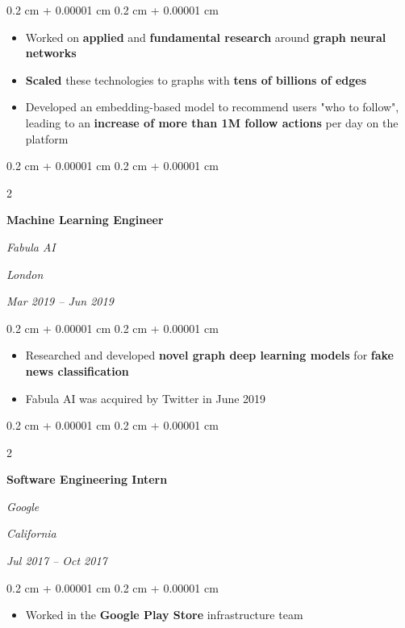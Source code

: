 \documentclass[10pt, letterpaper]{article}
\newenvironment{highlights}{
    \begin{itemize}[
        topsep=0.10 cm,
        parsep=0.10 cm,
        partopsep=0pt,
        itemsep=0pt,
        leftmargin=0.4 cm + 10pt
    ]
}{
    \end{itemize}
} %
\newenvironment{onecolentry}{
    \begin{adjustwidth}{
        0.2 cm + 0.00001 cm
    }{
        0.2 cm + 0.00001 cm
    }
}{
    \end{adjustwidth}
} %
\newenvironment{twocolentry}[2][]{
    \onecolentry
    \def\secondColumn{#2}
    \setcolumnwidth{\fill, 4.5 cm}
    \begin{paracol}{2}
}{
    \switchcolumn \raggedleft \secondColumn
    \end{paracol}
    \endonecolentry
} %
\begin{document}
    \vspace{0.10 cm}
    \begin{onecolentry}
        \begin{highlights}
            \item Worked on \textbf{applied} and \textbf{fundamental research} around \textbf{graph neural networks}
            \item \textbf{Scaled} these technologies to graphs with \textbf{tens of billions of edges}
            \item Developed an embedding-based model to recommend users "who to follow", leading to an \textbf{increase of more than 1M follow actions} per day on the platform
        \end{highlights}
    \end{onecolentry}

    \vspace{0.2 cm}

    \begin{twocolentry}{
    \textit{London}
        
    \textit{Mar 2019 – Jun 2019}}
        \textbf{Machine Learning Engineer}
        
        \textit{Fabula AI}
    \end{twocolentry}

    \vspace{0.10 cm}
    \begin{onecolentry}
        \begin{highlights}
            \item Researched and developed \textbf{novel graph deep learning models} for \textbf{fake news classification}
            \item Fabula AI was acquired by Twitter in June 2019
        \end{highlights}
    \end{onecolentry}

    \vspace{0.2 cm}

    \begin{twocolentry}{
    \textit{California}
        
    \textit{Jul 2017 – Oct 2017}}
        \textbf{Software Engineering Intern}
        
        \textit{Google}
    \end{twocolentry}

    \vspace{0.10 cm}
    \begin{onecolentry}
        \begin{highlights}
            \item Worked in the \textbf{Google Play Store} infrastructure team
        \end{highlights}
    \end{onecolentry}
\end{document}
